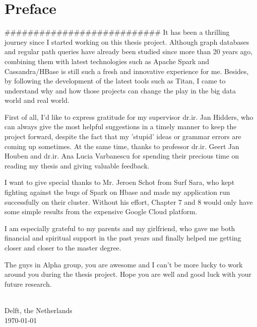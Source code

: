 
\chapter{\label{cha:Preface}Preface}
###########################
It has been a thrilling journey since I started working on this thesis project. Although graph databases and regular path queries have already been studied since more than 20 years ago, combining them with latest technologies such as Apache Spark and Cassandra/HBase is still such a fresh and innovative experience for me. Besides, by following the development of the latest tools such as Titan, I came to understand why and how those projects can change the play in the big data world and real world.

First of all, I'd like to express gratitude for my supervisor dr.ir. Jan Hidders, who can always give the most helpful suggestions in a timely manner to keep the project forward, despite the fact that my 'stupid' ideas or grammar errors are coming up sometimes. At the same time, thanks to professor dr.ir. Geert Jan Houben and dr.ir. Ana Lucia Varbanescu for spending their precious time on reading my thesis and giving valuable feedback.

I want to give special thanks to Mr. Jeroen Schot from Surf Sara, who kept fighting against the bugs of Spark on Hbase and
 made my application run successfully on their cluster. Without his effort, Chapter 7 and 8 would only have some simple results from the expensive Google Cloud platform.
 
I am especially grateful to my parents and my girlfriend, who gave me both financial and spiritual support in the past years and finally helped me getting closer and closer to the master degree.

The guys in Alpha group, you are awesome and I can't be more lucky to work around you during the thesis project. Hope you are well and good luck with your future research.

\vskip1cm 

\begin{flushright}
\theauthor\\
 Delft, the Netherlands \\
 \today\\
 
\par\end{flushright}
